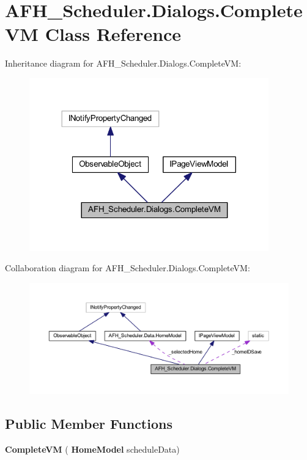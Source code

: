 \section{A\+F\+H\+\_\+\+Scheduler.\+Dialogs.\+Complete\+VM Class Reference}
\label{class_a_f_h___scheduler_1_1_dialogs_1_1_complete_v_m}


Inheritance diagram for A\+F\+H\+\_\+\+Scheduler.\+Dialogs.\+Complete\+VM\+:
\nopagebreak
\begin{figure}[H]
\begin{center}
\leavevmode
\includegraphics[width=293pt]{class_a_f_h___scheduler_1_1_dialogs_1_1_complete_v_m__inherit__graph}
\end{center}
\end{figure}


Collaboration diagram for A\+F\+H\+\_\+\+Scheduler.\+Dialogs.\+Complete\+VM\+:
\nopagebreak
\begin{figure}[H]
\begin{center}
\leavevmode
\includegraphics[width=350pt]{class_a_f_h___scheduler_1_1_dialogs_1_1_complete_v_m__coll__graph}
\end{center}
\end{figure}
\subsection*{Public Member Functions}
\begin{DoxyCompactItemize}
\item 
\textbf{ Complete\+VM} (\textbf{ Home\+Model} schedule\+Data)
\end{DoxyCompactItemize}
